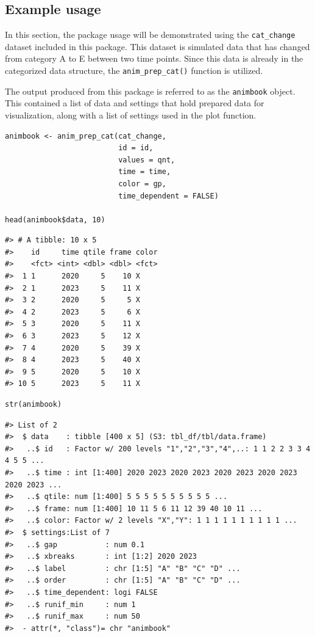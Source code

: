 \hypertarget{example-usage}{%
\subsection{Example usage}\label{example-usage}}

In this section, the package usage will be demonstrated using the \texttt{cat\_change} dataset included in this package. This dataset is simulated data that has changed from category A to E between two time points. Since this data is already in the categorized data structure, the \texttt{anim\_prep\_cat()} function is utilized.

The output produced from this package is referred to as the \texttt{animbook} object. This contained a list of data and settings that hold prepared data for visualization, along with a list of settings used in the plot function.

\begin{verbatim}
animbook <- anim_prep_cat(cat_change, 
                          id = id, 
                          values = qnt, 
                          time = time, 
                          color = gp, 
                          time_dependent = FALSE)

head(animbook$data, 10)
\end{verbatim}

\begin{verbatim}
#> # A tibble: 10 x 5
#>    id     time qtile frame color
#>    <fct> <int> <dbl> <dbl> <fct>
#>  1 1      2020     5    10 X    
#>  2 1      2023     5    11 X    
#>  3 2      2020     5     5 X    
#>  4 2      2023     5     6 X    
#>  5 3      2020     5    11 X    
#>  6 3      2023     5    12 X    
#>  7 4      2020     5    39 X    
#>  8 4      2023     5    40 X    
#>  9 5      2020     5    10 X    
#> 10 5      2023     5    11 X
\end{verbatim}

\begin{verbatim}
str(animbook)
\end{verbatim}

\begin{verbatim}
#> List of 2
#>  $ data    : tibble [400 x 5] (S3: tbl_df/tbl/data.frame)
#>   ..$ id   : Factor w/ 200 levels "1","2","3","4",..: 1 1 2 2 3 3 4 4 5 5 ...
#>   ..$ time : int [1:400] 2020 2023 2020 2023 2020 2023 2020 2023 2020 2023 ...
#>   ..$ qtile: num [1:400] 5 5 5 5 5 5 5 5 5 5 ...
#>   ..$ frame: num [1:400] 10 11 5 6 11 12 39 40 10 11 ...
#>   ..$ color: Factor w/ 2 levels "X","Y": 1 1 1 1 1 1 1 1 1 1 ...
#>  $ settings:List of 7
#>   ..$ gap           : num 0.1
#>   ..$ xbreaks       : int [1:2] 2020 2023
#>   ..$ label         : chr [1:5] "A" "B" "C" "D" ...
#>   ..$ order         : chr [1:5] "A" "B" "C" "D" ...
#>   ..$ time_dependent: logi FALSE
#>   ..$ runif_min     : num 1
#>   ..$ runif_max     : num 50
#>  - attr(*, "class")= chr "animbook"
\end{verbatim}

